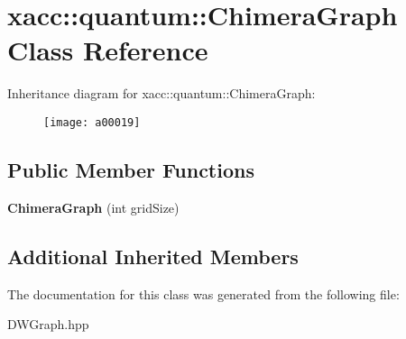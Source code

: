 \hypertarget{a00019}{}\section{xacc\+:\+:quantum\+:\+:Chimera\+Graph Class Reference}
\label{a00019}
Inheritance diagram for xacc\+:\+:quantum\+:\+:Chimera\+Graph\+:\begin{figure}[H]
\begin{center}
\leavevmode
\texttt{[image: a00019]}
\end{center}
\end{figure}
\subsection*{Public Member Functions}
\begin{DoxyCompactItemize}
\item 
{\bfseries Chimera\+Graph} (int grid\+Size)\hypertarget{a00019_a64f23e464ba85d6625fe1fc2d2608052}{}\label{a00019_a64f23e464ba85d6625fe1fc2d2608052}

\end{DoxyCompactItemize}
\subsection*{Additional Inherited Members}


The documentation for this class was generated from the following file\+:\begin{DoxyCompactItemize}
\item 
D\+W\+Graph.\+hpp\end{DoxyCompactItemize}
